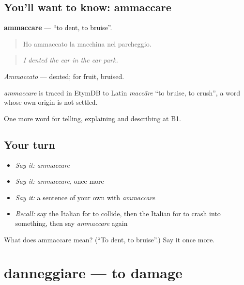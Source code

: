 \subsection*{You'll want to know: ammaccare}
\textbf{ammaccare} — \textquotedblleft{}to dent, to bruise\textquotedblright{}.

\begin{quote}
Ho ammaccato la macchina nel parcheggio.
\end{quote}

\begin{quote}
\emph{I dented the car in the car park.}
\end{quote}

\emph{Ammaccato} — dented; for fruit, bruised.

\begin{cousinweb}
\emph{ammaccare} is traced in EtymDB to Latin \emph{maccāre} \textquotedblleft{}to bruise, to crush\textquotedblright{}, a word whose own origin is not settled.
\end{cousinweb}

\begin{grammarlens}[title={What you've built}]
One more word for telling, explaining and describing at B1.
\end{grammarlens}

\subsection*{Your turn}
\begin{itemize}
\raggedright
  \item \emph{Say it:} \emph{ammaccare}
  \item \emph{Say it:} \emph{ammaccare}, once more
  \item \emph{Say it:} a sentence of your own with \emph{ammaccare}
  \item \emph{Recall:} say the Italian for to collide, then the Italian for to crash into something, then say \emph{ammaccare} again
\end{itemize}

\begin{tcolorbox}[breakable,colback=teal!4,colframe=teal!35!black,title={Before you move on}]
What does ammaccare mean? (\textquotedblleft{}To dent, to bruise\textquotedblright{}.) Say it once more.
\end{tcolorbox}
\section[danneggiare]{danneggiare — to damage}

